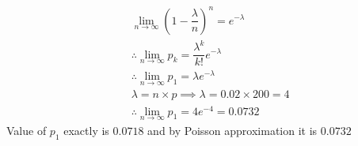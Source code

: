 \documentclass{beamer}
\begin{document}
      \begin{frame}
       \begin{align}
          &\lim_{n \to \infty} (1-\dfrac{\lambda}{n})^n = e^{-\lambda}\\
          &\therefore \lim_{n \to \infty} p_k=\dfrac{\lambda^k}{k!}e^{-\lambda}\\
          &\therefore \lim_{n \to \infty} p_1=\lambda e^{-\lambda}\\
         & \lambda=n\times p \implies \lambda = 0.02\times200 = 4\\
        &\therefore  \lim_{n \to \infty} p_1= 4e^{-4}= 0.0732
        \end{align}
        Value of $p_1$ exactly is $0.0718$ and by Poisson approximation it is $0.0732$
        \end{frame}
\end{document}
